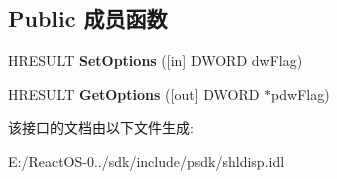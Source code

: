 \subsection*{Public 成员函数}
\begin{DoxyCompactItemize}
\item 
\mbox{\label{interface_i_auto_complete2_a7c9810381de45a3b564accd7446c9d07}} 
H\+R\+E\+S\+U\+LT {\bfseries Set\+Options} (\mbox{[}in\mbox{]} D\+W\+O\+RD dw\+Flag)
\item 
\mbox{\label{interface_i_auto_complete2_ad334a80f5cffd246a3f2a4a96e93c42e}} 
H\+R\+E\+S\+U\+LT {\bfseries Get\+Options} (\mbox{[}out\mbox{]} D\+W\+O\+RD $\ast$pdw\+Flag)
\end{DoxyCompactItemize}


该接口的文档由以下文件生成\+:\begin{DoxyCompactItemize}
\item 
E\+:/\+React\+O\+S-\/0../sdk/include/psdk/shldisp.\+idl\end{DoxyCompactItemize}
